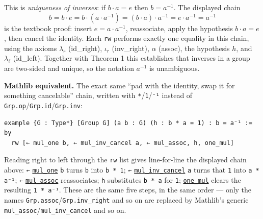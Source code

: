 \begin{mathreading}

This is \emph{uniqueness of inverses}: if \(b\cdot a =
e\) then \(b = a^{-1}\). The displayed chain \[
b = b\cdot e = b\cdot(a\cdot a^{-1}) = (b\cdot a)\cdot a^{-1} = e\cdot a^{-1}
= a^{-1}
\] is the textbook proof: insert \(e = a\cdot a^{-1}\), reassociate, apply the hypothesis \(b\cdot a = e\), then cancel the identity. Each \texttt{rw} performs exactly one equality in this chain, using the axioms \(\lambda_r\) (id\_right), \(\iota_r\) (inv\_right), \(\alpha\) (assoc), the hypothesis \(h\), and \(\lambda_\ell\) (id\_left). Together with Theorem 1 this establishes that inverses in a group are two-sided and unique, so the notation \(a^{-1}\) is unambiguous.

\end{mathreading}

\textbf{Mathlib equivalent.} The exact same ``pad with the identity, swap it for something cancelable'' chain, written with \texttt{*}/\texttt{1}/\texttt{⁻¹} instead of \texttt{Grp.op}/\texttt{Grp.id}/\texttt{Grp.inv}:

\begin{lstlisting}
example {G : Type*} [Group G] (a b : G) (h : b * a = 1) : b = a⁻¹ := by
  rw [← mul_one b, ← mul_inv_cancel a, ← mul_assoc, h, one_mul]
\end{lstlisting}

Reading right to left through the \texttt{rw} list gives line-for-line the displayed chain above: \texttt{←} \href{https://loogle.lean-lang.org/?q=mul_one}{\texttt{mul\_\allowbreak{}one}} \texttt{b} turns \texttt{b} into \texttt{b * 1}; \texttt{←} \href{https://loogle.lean-lang.org/?q=mul_inv_cancel}{\texttt{mul\_\allowbreak{}inv\_\allowbreak{}cancel}} \texttt{a} turns that \texttt{1} into \texttt{a * a⁻¹}; \texttt{←} \href{https://loogle.lean-lang.org/?q=mul_assoc}{\texttt{mul\_\allowbreak{}assoc}} reassociates; \texttt{h} substitutes \texttt{b * a} for \texttt{1}; \href{https://loogle.lean-lang.org/?q=one_mul}{\texttt{one\_\allowbreak{}mul}} clears the resulting \texttt{1 * a⁻¹}. These are the same five steps, in the same order --- only the names \texttt{Grp.assoc}/\texttt{Grp.inv\_\allowbreak{}right} and so on are replaced by Mathlib's generic \texttt{mul\_\allowbreak{}assoc}/\texttt{mul\_\allowbreak{}inv\_\allowbreak{}cancel} and so on.
